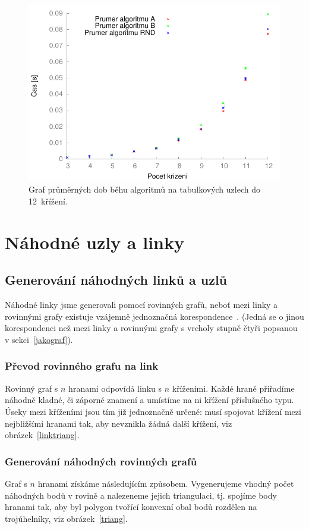 \begin{figure}[p]\centering
\includegraphics{../img/srovTable}
\caption{Graf průměrných dob běhu algoritmů na tabulkových uzlech do 12~křížení.}
\label{obr03:srovTable}
\end{figure}


\section{Náhodné uzly a linky}

\subsection{Generování náhodných linků a uzlů}
Náhodné linky jsme generovali pomocí rovinných grafů, neboť mezi linky a rovinnými grafy existuje vzájemně jednoznačná korespondence~\cite{Adams2004}. (Jedná se o jinou korespondenci než mezi linky a rovinnými grafy s vrcholy stupně čtyři popsanou v sekci~\ref{jakograf}).

\subsubsection{Převod rovinného grafu na link}
Rovinný graf s $n$ hranami odpovídá linku s $n$ kříženími. Každé hraně přiřadíme náhodně kladné, či záporné znamení a umístíme na ni křížení příslušného typu. Úseky mezi kříženími jsou tím již jednoznačně určené: musí spojovat křížení mezi nejbližšími hranami tak, aby nevznikla žádná další křížení, viz obrázek~\ref{linktriang}.

\subsubsection{Generování náhodných rovinných grafů}
Graf s $n$ hranami získáme následujícím způsobem. Vygenerujeme vhodný počet náhodných bodů v rovině a nalezeneme jejich triangulaci, tj. spojíme body hranami tak, aby byl polygon tvořící konvexní obal bodů rozdělen na trojúhelníky, viz obrázek~\ref{triang}.


